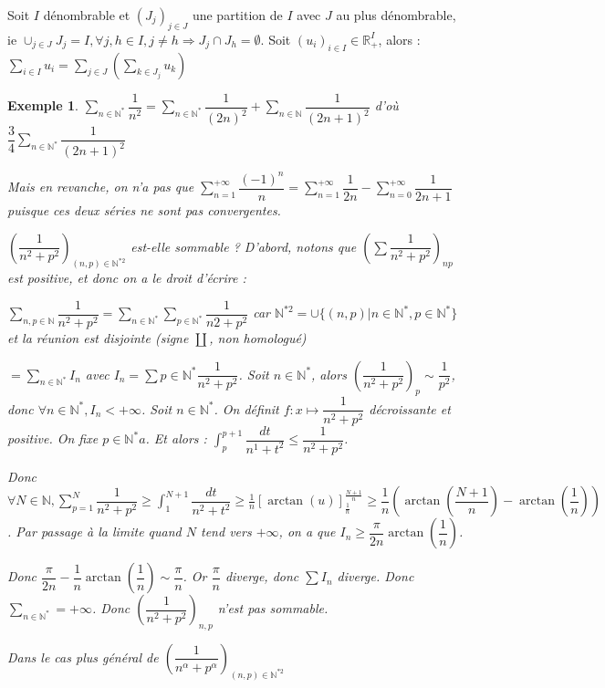 \documentclass[a4paper,12pt]{book}
\newcommand{\Thr}[2]{\begin{tcolorbox}[sharp corners, colback=white,colframe=red!90!black!75, title=Théorème : #1]#2\end{tcolorbox}}
\newtheorem{Exe}{Exemple}[section]
\def\R{\mathbb{R}}
\def\N{\mathbb{N}}
\begin{document}
\Thr{Sommation par paquets positif}{Soit $I$ dénombrable et $(J_j)_{j\in J}$ une partition de $I$ avec $J$ au plus dénombrable, ie $\cup_{j\in J} J_j = I, \forall j, h\in I, j\neq h \Rightarrow J_j\cap J_h = \emptyset$. Soit $(u_i)_{i\in I}\in\R_+^I$, alors : $\sum\limits_{i\in I} u_i = \sum\limits_{j\in J}\left(\sum\limits_{k\in J_j}u_k\right)$ }
\begin{Exe}
$\sum\limits_{n\in\N^*} \dfrac{1}{n^2} = \sum\limits_{n\in\N^*}\dfrac{1}{(2n)^2} + \sum\limits_{n\in\N}\dfrac{1}{(2n+1)^2}$ d'où $\dfrac{3}{4}\sum\limits_{n\in\N^*}\dfrac{1}{(2n+1)^2}$
\par Mais en revanche, on n'a pas que $\sum\limits_{n=1}^{+\infty}\dfrac{(-1)^n}{n} = \sum\limits_{n=1}^{+\infty}\dfrac{1}{2n} - \sum\limits_{n=0}^{+\infty}\dfrac{1}{2n+1}$ puisque ces deux séries ne sont pas convergentes.
\par $\left(\dfrac{1}{n^2+p^2}\right)_{(n,p)\in\N^{*2}}$ est-elle sommable ? D'abord, notons que $\left(\sum\dfrac{1}{n^2+p^2}\right)_{np}$ est positive, et donc on a le droit d'écrire :
\par $\sum\limits_{n,p\in\N}\dfrac{1}{n^2+p^2} = \sum\limits_{n\in\N^*}\sum\limits_{p\in\N^*} \dfrac{1}{n2+p^2}$ car $\N^{*2}=\cup \{(n,p)\vert n\in\N^*, p\in\N^*\}$ et la réunion est disjointe (signe $\coprod$, non homologué)
\par $= \sum\limits_{n\in\N^*}I_n$ avec $I_n=\sum{p\in\N^*}\dfrac{1}{n^2+p^2}$. Soit $n\in\N^*$, alors $\left(\dfrac{1}{n^2+p^2}\right)_p\sim \dfrac{1}{p^2}$, donc $\forall n\in\N^*, I_n<+\infty$. Soit $n\in\N^*$. On définit $f:x\mapsto \dfrac{1}{n^2+p^2}$ décroissante et positive. On fixe  $p\in\N^*a$. Et alors : $\int_p^{p+1}\dfrac{dt}{n^1+t^2}\leq\dfrac{1}{n^2+p^2}$.
\par Donc $\forall N\in\N,\sum\limits_{p=1}^N\dfrac{1}{n^2+p^2}\geq \int_1^{N+1}\dfrac{dt}{n^2+t^2} \geq \frac{1}{n}\left[\arctan(u)\right]_{\frac{1}{n}}^{\frac{N+1}{n}}\geq \dfrac{1}{n}\left(\arctan(\dfrac{N+1}{n})-\arctan(\dfrac{1}{n})\right)$. Par passage à la limite quand $N$ tend vers $+\infty$, on a que $I_n\geq \dfrac{\pi}{2n}\arctan(\dfrac{1}{n})$.
\par Donc $\dfrac{\pi}{2n}-\dfrac{1}{n}\arctan(\dfrac{1}{n})\sim\dfrac{\pi}{n}$. Or $\dfrac{\pi}{n}$ diverge, donc $\sum I_n$ diverge. Donc $\sum\limits_{n\in\N^*} =+\infty$. Donc $\left(\dfrac{1}{n^2+p^2}\right)_{n,p}$ n'est pas sommable.
\par Dans le cas plus général de $\left(\dfrac{1}{n^\alpha+p^\alpha}\right)_{(n,p)\in\N^{*2}}$
\end{Exe}
\end{document}
